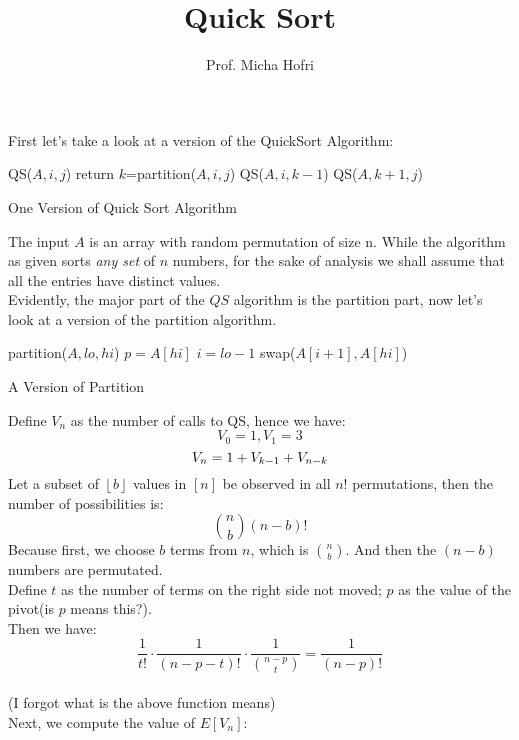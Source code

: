 \documentclass{article}
\title{Quick Sort}
\author{Prof. Micha Hofri}
\begin{document}
\maketitle
First let's take a look at a version of the QuickSort Algorithm:\\
\begin{algorithm}[H]
QS($A, i, j$)\;
 {return\;}
$k$=partition($A, i, j$)\;
QS($A, i, k-1$)\;
QS($A, k+1, j$)\;
\caption{One Version of Quick Sort Algorithm}
\end{algorithm}
The input $A$ is an array with random permutation of
size n. While the algorithm as given sorts {\em any set} of $n$ numbers,
for the sake of analysis we shall assume that all the entries have distinct
values.\\
Evidently, the major part of the $QS$ algorithm is the partition
part, now let's look at a version of the partition algorithm.\\
\begin{algorithm}[H]
partition($A, lo, hi$)\;
$p = A[hi]$\;
$i = lo-1$\;
 {
 }
swap($A[i+1], A[hi]$)\;
\caption{A Version of Partition}
\end{algorithm}
Define $V_n$ as the number of calls to QS, hence we have:\\
\[
V_0=1, V_1=3 
\]
\[
V_n=1+V_{k-1}+V_{n-k} \\
\]
Let a subset of $\left\lfloor{b}\right\rfloor$ values in $[n]$ be observed in all $n!$
permutations, then the number of possibilities is:\\
\[\binom{n}{b}(n-b)!\]
Because first, we choose $b$ terms from $n$, which is
$\binom{n}{b}$. And then the $(n-b)$ numbers are permutated.\\
Define $t$ as the number of terms on the right side not moved; $p$ as
the value of the pivot(is $p$ means this?).\\
Then we have:\\
\[\frac{1}{t!}\cdot\frac{1}{(n-p-t)!}\cdot\frac{1}{\binom{n-p}{t}}=\frac{1}{(n-p)!}\]\\
(I forgot what is the above function means) \\
Next, we compute the value of $E[V_n]$:  %
\end{document}
